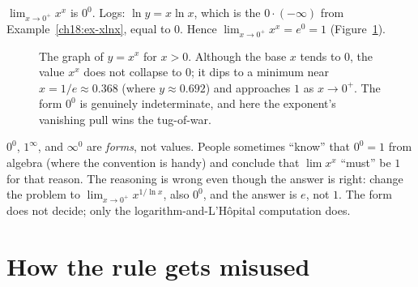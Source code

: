 \begin{example}[A $0^{0}$]\label{ch18:ex-00}
$\displaystyle\lim_{x\to 0^+}x^{x}$ is $0^{0}$. Logs: $\ln y=x\ln x$, which is the $0\cdot(-\infty)$ from
Example~\ref{ch18:ex-xlnx}, equal to $0$. Hence $\lim_{x\to0^+}x^x=e^{0}=1$ (Figure~\ref{ch18:fig-xx}).
\end{example}

\begin{figure}[H]
\centering
{}
\caption{The graph of $y=x^x$ for $x>0$. Although the base $x$ tends to $0$, the value
$x^x$ does not collapse to $0$; it dips to a minimum near $x = 1/e \approx 0.368$
(where $y \approx 0.692$) and approaches $1$ as $x\to 0^+$. The form $0^0$ is
genuinely indeterminate, and here the exponent's vanishing pull wins the tug-of-war.}
\label{ch18:fig-xx}
\end{figure}

\begin{trapbox}
$0^0$, $1^\infty$, and $\infty^0$ are \emph{forms}, not values. People sometimes
``know'' that $0^0=1$ from algebra (where the convention is handy) and conclude that
$\lim x^x$ ``must'' be $1$ for that reason. The reasoning is wrong even though the
answer is right: change the problem to $\lim_{x\to 0^+}x^{1/\ln x}$, also $0^0$, and
the answer is $e$, not $1$. The form does not decide; only the
logarithm-and-L'H\^opital computation does.
\end{trapbox}

\section{How the rule gets misused}

